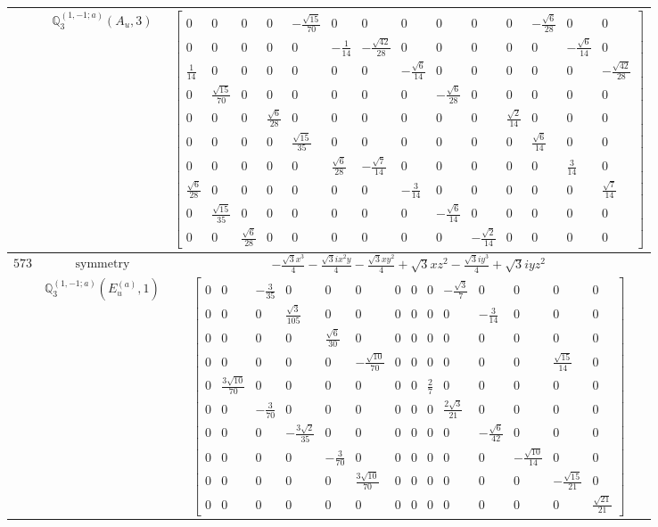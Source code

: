\documentclass[fleqn,8pt,landscape]{jsarticle}
\begin{document}
\begin{longtable}{ccc}
$  $ & $ \mathbb{Q}_{3}^{(1,-1;a)}(A_{u},3) $ & $ \begin{bmatrix} 0 & 0 & 0 & 0 & - \frac{\sqrt{15}}{70} & 0 & 0 & 0 & 0 & 0 & 0 & - \frac{\sqrt{6}}{28} & 0 & 0 \\ 0 & 0 & 0 & 0 & 0 & - \frac{1}{14} & - \frac{\sqrt{42}}{28} & 0 & 0 & 0 & 0 & 0 & - \frac{\sqrt{6}}{14} & 0 \\ \frac{1}{14} & 0 & 0 & 0 & 0 & 0 & 0 & - \frac{\sqrt{6}}{14} & 0 & 0 & 0 & 0 & 0 & - \frac{\sqrt{42}}{28} \\ 0 & \frac{\sqrt{15}}{70} & 0 & 0 & 0 & 0 & 0 & 0 & - \frac{\sqrt{6}}{28} & 0 & 0 & 0 & 0 & 0 \\ 0 & 0 & 0 & \frac{\sqrt{6}}{28} & 0 & 0 & 0 & 0 & 0 & 0 & \frac{\sqrt{2}}{14} & 0 & 0 & 0 \\ 0 & 0 & 0 & 0 & \frac{\sqrt{15}}{35} & 0 & 0 & 0 & 0 & 0 & 0 & \frac{\sqrt{6}}{14} & 0 & 0 \\ 0 & 0 & 0 & 0 & 0 & \frac{\sqrt{6}}{28} & - \frac{\sqrt{7}}{14} & 0 & 0 & 0 & 0 & 0 & \frac{3}{14} & 0 \\ \frac{\sqrt{6}}{28} & 0 & 0 & 0 & 0 & 0 & 0 & - \frac{3}{14} & 0 & 0 & 0 & 0 & 0 & \frac{\sqrt{7}}{14} \\ 0 & \frac{\sqrt{15}}{35} & 0 & 0 & 0 & 0 & 0 & 0 & - \frac{\sqrt{6}}{14} & 0 & 0 & 0 & 0 & 0 \\ 0 & 0 & \frac{\sqrt{6}}{28} & 0 & 0 & 0 & 0 & 0 & 0 & - \frac{\sqrt{2}}{14} & 0 & 0 & 0 & 0 \end{bmatrix} $ \\ \hline
$ 573 $ & $ \text{symmetry} $ & $ - \frac{\sqrt{3} x^{3}}{4} - \frac{\sqrt{3} i x^{2} y}{4} - \frac{\sqrt{3} x y^{2}}{4} + \sqrt{3} x z^{2} - \frac{\sqrt{3} i y^{3}}{4} + \sqrt{3} i y z^{2} $ \\
$  $ & $ \mathbb{Q}_{3}^{(1,-1;a)}(E_{u}^{(a)},1) $ & $ \begin{bmatrix} 0 & 0 & - \frac{3}{35} & 0 & 0 & 0 & 0 & 0 & 0 & - \frac{\sqrt{3}}{7} & 0 & 0 & 0 & 0 \\ 0 & 0 & 0 & \frac{\sqrt{3}}{105} & 0 & 0 & 0 & 0 & 0 & 0 & - \frac{3}{14} & 0 & 0 & 0 \\ 0 & 0 & 0 & 0 & \frac{\sqrt{6}}{30} & 0 & 0 & 0 & 0 & 0 & 0 & 0 & 0 & 0 \\ 0 & 0 & 0 & 0 & 0 & - \frac{\sqrt{10}}{70} & 0 & 0 & 0 & 0 & 0 & 0 & \frac{\sqrt{15}}{14} & 0 \\ 0 & \frac{3 \sqrt{10}}{70} & 0 & 0 & 0 & 0 & 0 & 0 & \frac{2}{7} & 0 & 0 & 0 & 0 & 0 \\ 0 & 0 & - \frac{3}{70} & 0 & 0 & 0 & 0 & 0 & 0 & \frac{2 \sqrt{3}}{21} & 0 & 0 & 0 & 0 \\ 0 & 0 & 0 & - \frac{3 \sqrt{2}}{35} & 0 & 0 & 0 & 0 & 0 & 0 & - \frac{\sqrt{6}}{42} & 0 & 0 & 0 \\ 0 & 0 & 0 & 0 & - \frac{3}{70} & 0 & 0 & 0 & 0 & 0 & 0 & - \frac{\sqrt{10}}{14} & 0 & 0 \\ 0 & 0 & 0 & 0 & 0 & \frac{3 \sqrt{10}}{70} & 0 & 0 & 0 & 0 & 0 & 0 & - \frac{\sqrt{15}}{21} & 0 \\ 0 & 0 & 0 & 0 & 0 & 0 & 0 & 0 & 0 & 0 & 0 & 0 & 0 & \frac{\sqrt{21}}{21} \end{bmatrix} $ \\ \hline

\end{longtable}
\end{document}
